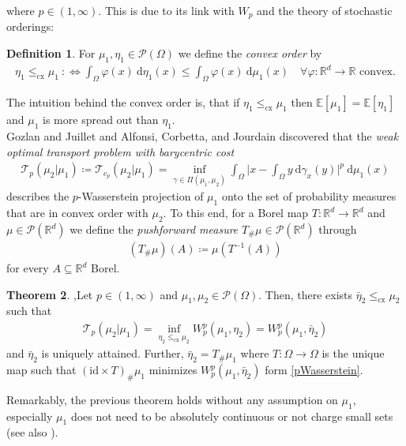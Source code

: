 \documentclass[letterpaper]{amsart}
\newcommand{\RR}{\mathbb{R}}
\newcommand{\EE}{\mathbb{E}}
\newcommand{\dd}{\mathrm{d}}
\theoremstyle{definition}
\newtheorem{thm}{Theorem}[section]
\newtheorem{definition}[thm]{Definition}
\begin{document}
where $p\in (1,\infty)$. This is due to its link with $W_p$ and the theory of stochastic orderings:
\begin{definition}
	For $\mu_1,\eta_1\in\mathcal P(\Omega)$ we define the \textit{convex order} by
	\begin{gather*}
		\eta_1\leq_{\text{cx}}\mu_1\ :\Leftrightarrow \int_{\Omega}\varphi(x)\ \dd\eta_1(x)\leq\int_{\Omega}\varphi(x)\ \dd\mu_1(x)\quad \forall\varphi:\RR^d\rightarrow\RR\text{ convex.}
	\end{gather*}
\end{definition}
The intuition behind the convex order is, that if $\eta_1\leq_{\text{cx}}\mu_1$ then $\EE[\mu_1]=\EE[\eta_1]$ and $\mu_1$ is more spread out than $\eta_1$.\\
Gozlan and Juillet \cite{gozlan2020} and Alfonsi, Corbetta, and Jourdain  \cite{alfonsi2020} discovered that the \textit{weak optimal transport problem with barycentric cost}
\begin{gather*}
	\mathcal T_p(\mu_2|\mu_1)\coloneqq\mathcal T_{c_p}(\mu_2|\mu_1)=\inf_{\gamma\in\Pi(\mu_1,\mu_2)}\int_{\Omega}\Big|x-\int_{\Omega}y\ \dd \gamma_x(y)\Big|^p\ \dd\mu_1(x)
\end{gather*}
describes the $p$-Wasserstein projection of $\mu_1$ onto the set of probability measures that are in convex order with $\mu_2$. To this end, for a Borel map $T:\RR^d\rightarrow\RR^d$ and $\mu\in\mathcal P(\RR^d)$ we define the \textit{pushforward measure} $T_\#\mu\in\mathcal P(\RR^d)$ through
\begin{gather*}
	(T_\#\mu)(A)\coloneqq \mu(T^{-1}(A))
\end{gather*}
for every $A\subseteq\RR^d$ Borel.
\begin{thm}\cite[Prop 1.1]{gozlan2020},\cite[Thm 2.1]{alfonsi2020}\label{weakforwardprojthm}
	Let $p\in(1,\infty)$ and $\mu_1,\mu_2\in\mathcal P(\Omega)$. Then, there exists $\bar\eta_2\leq_{\text{cx}}\mu_2$ such that
	\begin{gather*}
		\mathcal T_p(\mu_2|\mu_1)=\inf_{\eta_2\leq_{\text{cx}}\mu_2}W_p^p(\mu_1,\eta_2)=W_p^p(\mu_1,\bar\eta_2)
	\end{gather*}
	and $\bar\eta_2$ is uniquely attained. Further, $\bar\eta_2=T_{\#}\mu_1$ where $T:\Omega\rightarrow\Omega$ is the unique map such that $(\text{id}\times T)_{\#}\mu_1$ minimizes $W_p^p(\mu_1,\bar\eta_2)$ form \eqref{pWasserstein}.
\end{thm}
Remarkably, the previous theorem holds without any assumption on $\mu_1$, especially $\mu_1$ does not need to be absolutely continuous or not charge small sets (see also \cite[Rmk 1.2]{gozlan2017}).
\end{document}
